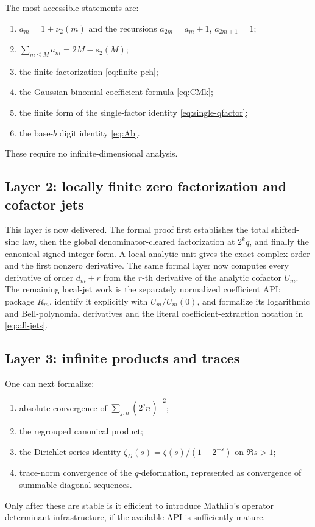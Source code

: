 \documentclass[11pt,oneside]{article}
\numberwithin{equation}{section}
\theoremstyle{plain}
\theoremstyle{definition}
\theoremstyle{remark}
\begin{document}
The most accessible statements are:
\begin{enumerate}[leftmargin=2em]
\item $a_m=1+\nu_2(m)$ and the recursions $a_{2m}=a_m+1$, $a_{2m+1}=1$;
\item $\sum_{m\le M}a_m=2M-s_2(M)$;
\item the finite factorization \cref{eq:finite-pch};
\item the Gaussian-binomial coefficient formula \cref{eq:CMk};
\item the finite form of the single-factor identity \cref{eq:single-qfactor};
\item the base-$b$ digit identity \cref{eq:Ab}.
\end{enumerate}
These require no infinite-dimensional analysis.

\subsection{Layer 2: locally finite zero factorization and cofactor jets}

This layer is now delivered.  The formal proof first establishes the total
shifted-sinc law, then the global denominator-cleared factorization at
\(2^kq\), and finally the canonical signed-integer form.  A local analytic
unit gives the exact complex order and the first nonzero derivative.  The
same formal layer now computes every derivative of order \(d_m+r\) from the
\(r\)-th derivative of the analytic cofactor \(U_m\).  The remaining
local-jet work is the separately normalized coefficient API: package \(R_m\),
identify it explicitly with \(U_m/U_m(0)\), and formalize its logarithmic and
Bell-polynomial derivatives and the literal coefficient-extraction notation
in \cref{eq:all-jets}.

\subsection{Layer 3: infinite products and traces}

One can next formalize:
\begin{enumerate}[leftmargin=2em]
\item absolute convergence of $\sum_{j,n}(2^jn)^{-2}$;
\item the regrouped canonical product;
\item the Dirichlet-series identity $\zeta_D(s)=\zeta(s)/(1-2^{-s})$ on $\Re s>1$;
\item trace-norm convergence of the $q$-deformation, represented as convergence of summable diagonal sequences.
\end{enumerate}
Only after these are stable is it efficient to introduce Mathlib's operator determinant infrastructure, if the available API is sufficiently mature.
\end{document}
